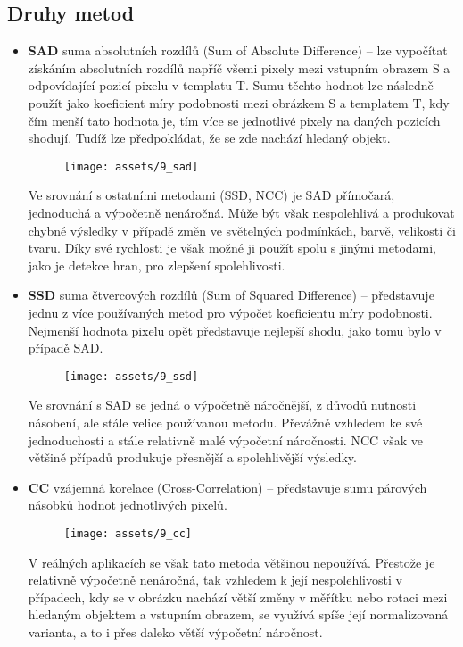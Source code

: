 \subsection{Druhy metod}
\begin{itemize}
    \item \textbf{SAD} suma absolutních rozdílů (Sum of Absolute Difference) --  lze vypočítat získáním absolutních rozdílů napříč všemi pixely mezi vstupním obrazem S a odpovídající pozicí pixelu v templatu T. Sumu těchto hodnot lze následně použít jako koeficient míry podobnosti mezi obrázkem S a templatem T, kdy čím menší tato hodnota je, tím více se jednotlivé pixely na daných pozicích shodují. Tudíž lze předpokládat, že se zde nachází hledaný objekt.
          \begin{figure}[H]
              \centering
              \texttt{[image: assets/9\_sad]}
          \end{figure}
          Ve srovnání s ostatními metodami (SSD, NCC) je SAD přímočará, jednoduchá a výpočetně nenáročná. Může být však nespolehlivá a produkovat chybné výsledky v případě změn ve světelných podmínkách, barvě, velikosti či tvaru. Díky své rychlosti je však možné ji použít spolu s jinými metodami, jako je detekce hran, pro zlepšení spolehlivosti.
    \item \textbf{SSD} suma čtvercových rozdílů (Sum of Squared Difference) --  představuje jednu z více používaných metod pro výpočet koeficientu míry podobnosti. Nejmenší hodnota pixelu opět představuje nejlepší shodu, jako tomu bylo v případě SAD.
          \begin{figure}[H]
              \centering
              \texttt{[image: assets/9\_ssd]}
          \end{figure}
          Ve srovnání s SAD se jedná o výpočetně náročnější, z důvodů nutnosti násobení, ale stále velice používanou metodu. Převážně vzhledem ke své jednoduchosti a stále relativně malé výpočetní náročnosti. NCC však ve většině případů produkuje přesnější a spolehlivější výsledky.
    \item \textbf{CC} vzájemná korelace (Cross-Correlation) --  představuje sumu párových násobků hodnot jednotlivých pixelů.
          \begin{figure}[H]
              \centering
              \texttt{[image: assets/9\_cc]}
          \end{figure}
          V reálných aplikacích se však tato metoda většinou nepoužívá. Přestože je relativně výpočetně nenáročná, tak vzhledem k její nespolehlivosti v případech, kdy se v obrázku nachází větší změny v měřítku nebo rotaci mezi hledaným objektem a vstupním obrazem, se využívá spíše její normalizovaná varianta, a to i přes daleko větší výpočetní náročnost.


\end{itemize}
